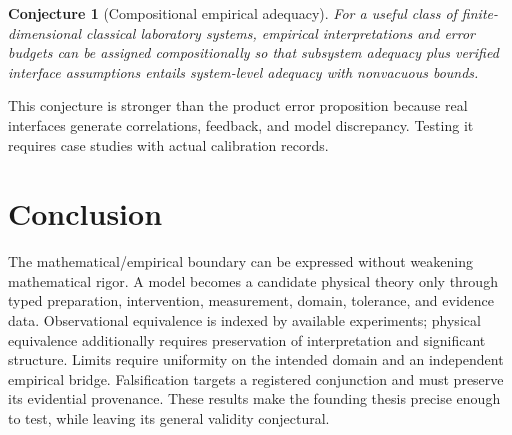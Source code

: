 \documentclass[11pt]{article}
\newtheorem{conjecture}[definition]{Conjecture}
\begin{document}
\begin{conjecture}[Compositional empirical adequacy]
For a useful class of finite-dimensional classical laboratory systems, empirical interpretations and error budgets can be assigned compositionally so that subsystem adequacy plus verified interface assumptions entails system-level adequacy with nonvacuous bounds.
\end{conjecture}

This conjecture is stronger than the product error proposition because real interfaces generate correlations, feedback, and model discrepancy.  Testing it requires case studies with actual calibration records.

\section{Conclusion}

The mathematical/empirical boundary can be expressed without weakening mathematical rigor.  A model becomes a candidate physical theory only through typed preparation, intervention, measurement, domain, tolerance, and evidence data.  Observational equivalence is indexed by available experiments; physical equivalence additionally requires preservation of interpretation and significant structure.  Limits require uniformity on the intended domain and an independent empirical bridge.  Falsification targets a registered conjunction and must preserve its evidential provenance.  These results make the founding thesis precise enough to test, while leaving its general validity conjectural.
\end{document}
